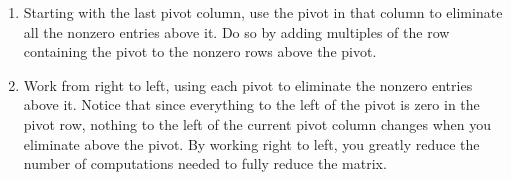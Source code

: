 \documentclass[letterpaper,oneside]{book}%
\theoremstyle{plain}
\theoremstyle{box}
\theoremstyle{problem}
\begin{document}
\begin{enumerate}
\begin{enumerate}
	\item Starting with the last pivot column, use the pivot in that column to eliminate all the nonzero entries above it. Do so by adding multiples of the row containing the pivot to the nonzero rows above the pivot. 
	\item Work from right to left, using each pivot to eliminate the nonzero entries above it. Notice that since everything to the left of the pivot is zero in the pivot row, nothing to the left of the current pivot column changes when you eliminate above the pivot.  By working right to left, you greatly reduce the number of computations needed to fully reduce the matrix.
\end{enumerate}
\end{enumerate}
\end{document}
